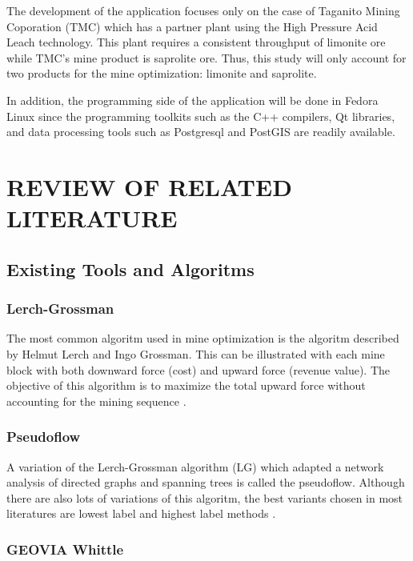 \documentclass[12pt]{report}
\begin{document}
The development of the application focuses only on the case of Taganito Mining Coporation (TMC) which has a partner plant using the High Pressure Acid Leach technology.
This plant requires a consistent throughput of limonite ore while TMC's mine product is saprolite ore.
Thus, this study will only account for two products for the mine optimization: limonite and saprolite.

In addition, the programming side of the application will be done in Fedora Linux \cite{fedora} since the programming toolkits such as the C++ compilers, Qt libraries, and data processing tools such as Postgresql \cite{postgres} and PostGIS \cite{postgis} are readily available.

\chapter{REVIEW OF RELATED LITERATURE}

\section{Existing Tools and Algoritms}

\subsection{Lerch-Grossman}

The most common algoritm used in mine optimization is the algoritm described by Helmut Lerch and Ingo Grossman.
This can be illustrated with each mine block with both downward force (cost) and upward force (revenue value).
The objective of this algorithm is to maximize the total upward force without accounting for the mining sequence \cite{IMS}.

\subsection{Pseudoflow}

A variation of the Lerch-Grossman algorithm (LG) which adapted a network analysis of directed graphs and spanning trees is called the pseudoflow.
Although there are also lots of variations of this algoritm, the best variants chosen in most literatures are lowest label and highest label methods \cite{pseudoflow}.

\subsection{GEOVIA Whittle}
\end{document}
